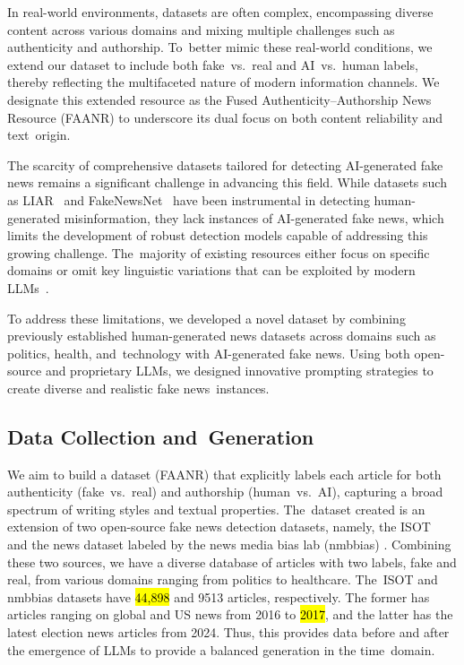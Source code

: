 \documentclass[electronics,article,accept,pdftex,moreauthors,electronics]{Definitions/mdpi}
\begin{document}
In real-world environments, datasets are often complex, encompassing diverse content across various domains and mixing multiple challenges such as authenticity and authorship. To~better mimic these real-world conditions, we extend our dataset to include both fake~vs.~real and AI~vs.~human labels, thereby reflecting the multifaceted nature of modern information channels. We designate this extended resource as the Fused Authenticity--Authorship News Resource (FAANR) to underscore its dual focus on both content reliability and text~origin.

The scarcity of comprehensive datasets tailored for detecting AI-generated fake news remains a significant challenge in advancing this field. While datasets such as LIAR~\cite{wang2017liar} and FakeNewsNet~\cite{shu2020leveraging} have been instrumental in detecting human-generated misinformation, they lack instances of AI-generated fake news, which limits the development of robust detection models capable of addressing this growing challenge. The~majority of existing resources either focus on specific domains or omit key linguistic variations that can be exploited by modern LLMs~\cite{luger2020health,de_transformer-based_2022}.

To address these limitations, we developed a novel dataset by combining previously established human-generated news datasets across domains such as politics, health, and~technology with AI-generated fake news. Using both open-source and proprietary LLMs, we designed innovative prompting strategies to create diverse and realistic fake news~instances.

\vspace{-3pt}

\subsection{Data Collection and~Generation}

We aim to build a dataset (FAANR) that explicitly labels each article for both authenticity (fake~vs.~real) and authorship (human~vs.~AI), capturing a broad spectrum of writing styles and textual properties. The~dataset created is an extension of two open-source fake news detection datasets, namely, the ISOT~\cite{ahmed2018detecting,traore2017intelligent} and the news dataset labeled by the news media bias lab (nmbbias) \cite{rahman2023analyzing}. Combining these two sources, we have a diverse database of articles with two labels, fake and real, from various domains ranging from politics to healthcare. %
The~ISOT and nmbbias datasets have \hl{44,898} %
 and 9513 articles, respectively. The former has articles ranging on global and US news from 2016 to \hl{2017}, %
 and the latter has the latest election news articles from 2024. Thus, this provides data before and after the emergence of LLMs to provide a balanced generation in the time~domain. %
\end{document}

